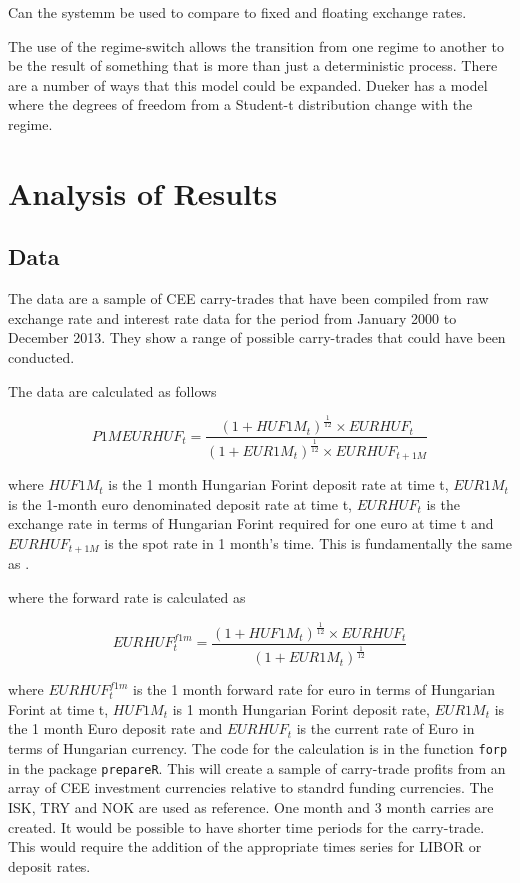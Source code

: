 \documentclass[12pt, a4paper, oneside]{article} %
\begin{document}
Can the systemm be used to compare to fixed and floating exchange rates. 

The use of the regime-switch allows the transition from one regime to another to be the result of something that is more than just a deterministic process. There are a number of ways that this model could be expanded.  Dueker has a model where the degrees of freedom from a Student-t distribution change with the regime.  



\section{Analysis of Results}
\subsection{Data}
The data are a sample of CEE carry-trades that have been compiled from raw exchange rate and interest rate data for the period from January 2000 to December 2013.  They show a range of possible carry-trades that could have been conducted. 

The data are calculated as follows

\begin{equation}\label{eqref:carryprofit}
P1MEURHUF_t = \frac{(1 + HUF1M_t)^{\frac{1}{12}} \times EURHUF_t }{(1 + EUR1M_t)^{\frac{1}{12}} \times EURHUF_{t+1M}}
\end{equation}

where $HUF1M_t$ is the 1 month Hungarian Forint deposit rate at time t, $EUR1M_t$ is the 1-month euro denominated deposit rate at time t, $EURHUF_t$ is the exchange rate in terms of  Hungarian Forint required for one euro at time t and  $EURHUF_{t+1M}$ is the spot rate in 1 month's time.  This is fundamentally the same as \citep{BrunnermeierCarry}.

where the forward rate is calculated as

\begin{equation}\label{eqref:forward}
EURHUF_t^{f1m} = \frac{(1 + HUF1M_t)^{\frac{1}{12}} \times EURHUF_t }{(1 + EUR1M_t)^{\frac{1}{12}}}
\end{equation}

where  $EURHUF_t^{f1m}$ is the 1 month forward rate for euro in terms of Hungarian Forint at time t, $HUF1M_t$ is 1 month Hungarian Forint deposit rate, $EUR1M_t$ is the 1 month Euro deposit rate and $EURHUF_t$ is the current rate of Euro in terms of Hungarian currency.  The code for the calculation is in the function \lstinline{forp} in the package \lstinline{prepareR}. This will create a sample of carry-trade profits from an array of CEE investment currencies relative to standrd funding currencies.   The ISK, TRY and NOK are used as reference.  One month and 3 month carries are created.  It would be possible to have shorter time periods for the carry-trade.   This would require the addition of the appropriate times series for LIBOR or deposit rates.  
\end{document}
